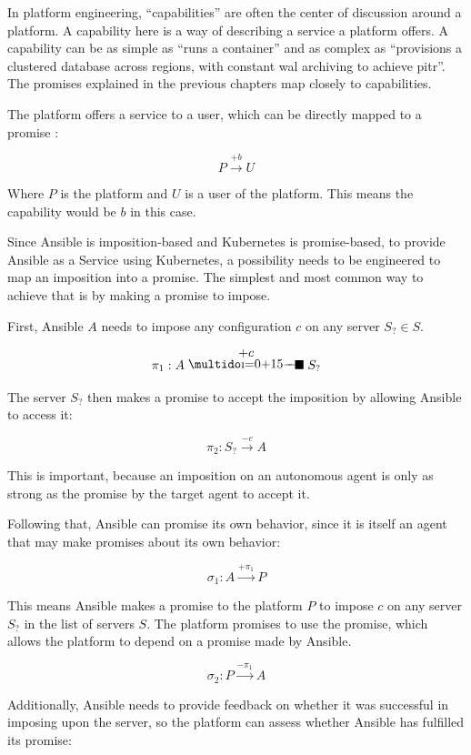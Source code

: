 In platform engineering, \enquote{capabilities} are often the center of discussion around a platform.
A capability here is a way of describing a service a platform offers.
A capability can be as simple as \enquote{runs a container} and as complex as \enquote{provisions a clustered database across regions, with constant \gls{wal} archiving to achieve \gls{pitr}}.
The promises explained in the previous chapters map closely to capabilities.
\parencite{platformengineering-architects, cncfPlatformEngineering}

\clearpage
The platform offers a service to a user, which can be directly mapped to a promise \parencite{promise-theory}:

\[ P \xrightarrow{+b} U \]

Where $P$ is the platform and $U$ is a user of the platform.
This means the capability would be $b$ in this case.

Since Ansible is imposition-based and Kubernetes is promise-based, to provide Ansible as a Service using Kubernetes, a possibility needs to be engineered to map an imposition into a promise.
The simplest and most common way to achieve that is by making a promise to impose.
\parencite{promise-theory}

First, Ansible $A$ needs to impose any configuration $c$ on any server $S_?
	\in S$.

\[ \pi _1: A \impose{+c}{5}
	S_?
\]

The server $S_?$ then makes a promise to accept the imposition by allowing Ansible to access it:

\[ \pi _2: S_? \xrightarrow{-c}
	A \]

This is important, because an imposition on an autonomous agent is only as strong as the promise by the target agent to accept it.
\parencite{promise-theory}

\clearpage
Following that, Ansible can promise its own behavior, since it is itself an agent that may make promises about its own behavior:

\[ \sigma _1: A \xrightarrow{+\pi _1} P \]

This means Ansible makes a promise to the platform $P$ to impose $c$ on any server $S_?$ in the list of servers $S$.
The platform promises to use the promise, which allows the platform to depend on a promise made by Ansible.

\[ \sigma _2: P \xrightarrow{-\pi _1} A \]

Additionally, Ansible needs to provide feedback on whether it was successful in imposing upon the server, so the platform can assess whether Ansible has fulfilled its promise:

